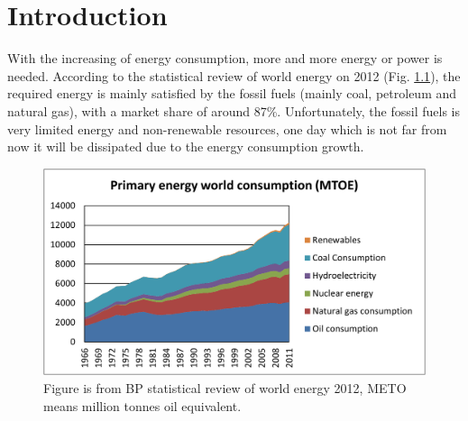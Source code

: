\documentclass[a4paper, 12pt, titlepage,oneside,drop]{kthesis}
\begin{document}
\newpage
\setcounter{page}{7}
\setcounter{secnumdepth}{3}
\setcounter{tocdepth}{3}
\tableofcontents







\newpage
{}
\chapter{Introduction}%

With the increasing of energy consumption, more and more energy or power is needed. According to the statistical review of world energy on 2012 (Fig. \ref{wpec}),
the required energy is mainly satisfied by the fossil fuels (mainly coal, petroleum and 
natural gas), with a market share of around 87\%. Unfortunately, the fossil fuels is very limited energy and non-renewable resources, one day which is not far from 
now it will be dissipated due to the energy consumption growth. 


\begin{figure}[H]
\centering
\includegraphics[scale=0.6]{world_Consumption.pdf}
\caption{Figure is from BP statistical review of world energy 2012, METO means million tonnes oil equivalent.}
\label{wpec}
\end{figure}
\end{document}
